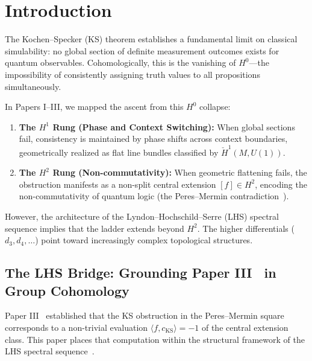 \documentclass[11pt]{article}
\begin{document}
\section{Introduction}

The Kochen--Specker (KS) theorem establishes a fundamental limit on classical simulability: no global section of definite measurement outcomes exists for quantum observables. Cohomologically, this is the vanishing of $H^0$---the impossibility of consistently assigning truth values to all propositions simultaneously.

In Papers I--III, we mapped the ascent from this $H^0$ collapse:
\begin{enumerate}
    \item \textbf{The $H^1$ Rung (Phase and Context Switching):} When global sections fail, consistency is maintained by phase shifts across context boundaries, geometrically realized as flat line bundles classified by $\check{H}^1(M, U(1))$.

    \item \textbf{The $H^2$ Rung (Non-commutativity):} When geometric flattening fails, the obstruction manifests as a non-split central extension $[f] \in H^2$, encoding the non-commutativity of quantum logic (the Peres--Mermin contradiction~\cite{Peres90,Mermin90}).
\end{enumerate}

However, the architecture of the Lyndon--Hochschild--Serre (LHS) spectral sequence implies that the ladder extends beyond $H^2$. The higher differentials ($d_3, d_4, \ldots$) point toward increasingly complex topological structures.

\subsection{The LHS Bridge: Grounding Paper III~\cite{PaperIII} in Group Cohomology}

Paper III~\cite{PaperIII} established that the KS obstruction in the Peres--Mermin square~\cite{Peres90,Mermin90} corresponds to a non-trivial evaluation $\langle f, c_{\text{KS}} \rangle = -1$ of the central extension class. This paper places that computation within the structural framework of the LHS spectral sequence~\cite{HS53,Brown82}.
\end{document}
